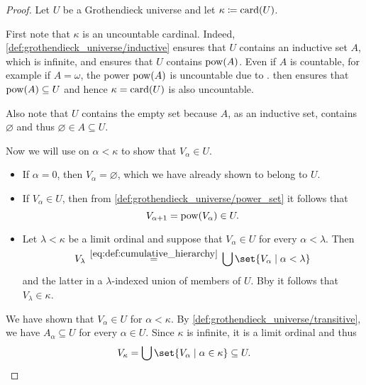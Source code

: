 \begin{proof}
  \NecessitySubProof Let \( U \) be a Grothendieck universe and let \( \kappa \coloneqq \operatorname{card}(U) \).

  First note that \( \kappa \) is an uncountable cardinal. Indeed, \ref{def:grothendieck_universe/inductive} ensures that \( U \) contains an inductive set \( A \), which is infinite, and  ensures that \( U \) contains \( \operatorname{pow}(A) \). Even if \( A \) is countable, for example if \( A = \omega \), the power \( \operatorname{pow}(A) \) is uncountable due to .  then ensures that \( \operatorname{pow}(A) \subseteq U \) and hence \( \kappa = \operatorname{card}(U) \) is also uncountable.

  Also note that \( U \) contains the empty set because \( A \), as an inductive set, contains \( \varnothing \) and thus \( \varnothing \in A \subseteq U \).

  Now we will use  on \( \alpha < \kappa \) to show that \( V_\alpha \in U \).
  \begin{itemize}
    \item If \( \alpha = 0 \), then \( V_\alpha = \varnothing \), which we have already shown to belong to \( U \).
    \item If \( V_\alpha \in U \), then from \ref{def:grothendieck_universe/power_set} it follows that
    \begin{equation*}
      V_{\alpha + 1} = \operatorname{pow}(V_\alpha) \in U.
    \end{equation*}

    \item Let \( \lambda < \kappa \) be a limit ordinal and suppose that \( V_\alpha \in U \) for every \( \alpha < \lambda \). Then
    \begin{equation*}
      V_\lambda
      \reloset {\eqref{eq:def:cumulative_hierarchy}} =
      \bigcup\set{ V_\alpha \given \alpha < \lambda }
    \end{equation*}
    and the latter in a \( \lambda \)-indexed union of members of \( U \). Bby  it follows that \( V_\lambda \in \kappa \).
  \end{itemize}

  We have shown that \( V_\alpha \in U \) for \( \alpha < \kappa \). By \ref{def:grothendieck_universe/transitive}, we have \( A_\alpha \subseteq U \) for every \( \alpha \in U \). Since \( \kappa \) is infinite,  it is a limit ordinal and thus
  \begin{equation*}
    V_\kappa
    =
    \bigcup\set{ V_\alpha \given \alpha \in \kappa }
    \subseteq
    U.
  \end{equation*}


\end{proof}
